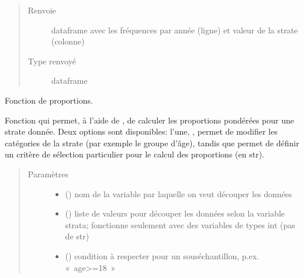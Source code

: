 \documentclass[letterpaper,10pt,french]{sphinxmanual}
\begin{document}
\begin{fulllineitems}
\begin{fulllineitems}
\begin{quote}
\begin{description}
\item[{Renvoie}] \leavevmode
dataframe avec les fréquences par année (ligne) et valeur de la strate (colonne)

\item[{Type renvoyé}] \leavevmode
dataframe

\end{description}\end{quote}

\end{fulllineitems}


\begin{fulllineitems}
\label{\detokenize{code:simgen.statistics.prop}}
Fonction de proportions.

Fonction qui permet, à l’aide de , de calculer les proportions pondérées pour une strate donnée. Deux options sont disponibles: l’une, , permet de modifier les catégories de la strate (par exemple le groupe d’âge), tandis que  permet de définir un critère de sélection particulier pour le calcul des proportions (en str).
\begin{quote}\begin{description}
\item[{Paramètres}] \leavevmode\begin{itemize}
\item {} 
 () \textendash{} nom de la variable par laquelle on veut découper les données

\item {} 
 () \textendash{} liste de valeurs pour découper les données selon la variable strata; fonctionne seulement avec des variables de types int (pas de str)

\item {} 
 () \textendash{} condition à respecter pour un sous\sphinxhyphen{}échantillon, p.ex. « age\textgreater{}=18 »


\end{itemize}
\end{description}
\end{quote}
\end{fulllineitems}
\end{fulllineitems}
\end{document}
